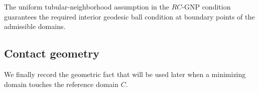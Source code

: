 \documentclass{article}
\renewcommand{\boxed}[1]{#1}
\newtheorem{lemma}[theorem]{Lemme}
\newenvironment{proof}[1][Proof]{\textbf{#1.} }{\ \rule{0.5em}{0.5em}}
\begin{document}
The uniform tubular-neighborhood assumption in the
$RC$-GNP condition guarantees the required interior geodesic ball
condition at boundary points of the admissible domains.

\subsection{Contact geometry}
\label{subsec:contact-geometry}

We finally record the geometric fact that will be used later when a
minimizing domain touches the reference domain $C$.

\end{document}
